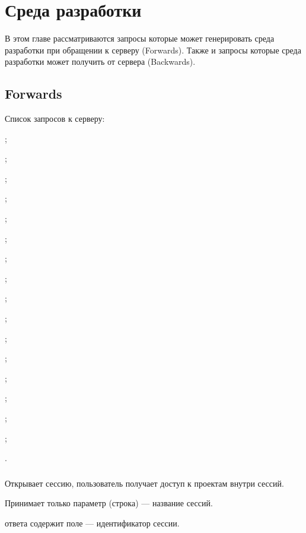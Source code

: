 \section{Среда разработки}

В этом главе рассматриваются запросы которые может генерировать среда разработки при обращении к серверу (Forwards). Также и запросы которые среда разработки может получить от сервера (Backwards).

\subsection{Forwards}

Список запросов к серверу:
\begin{icItems}
	\item {};
	\item {};
	\item {};
	\item {};
	\item {};
	\item {};
	\item {};
	\item {};
	\item {};
	\item {};
	\item {};
	\item {};
	\item {};
	\item {};
	\item {};
	\item {};
	\item {}.
\end{icItems}

\subsubsection{}

Открывает сессию, пользователь получает доступ к проектам внутри сессий.

Принимает только параметр  (строка) — название сессий.

 ответа содержит поле  — идентификатор сессии.

